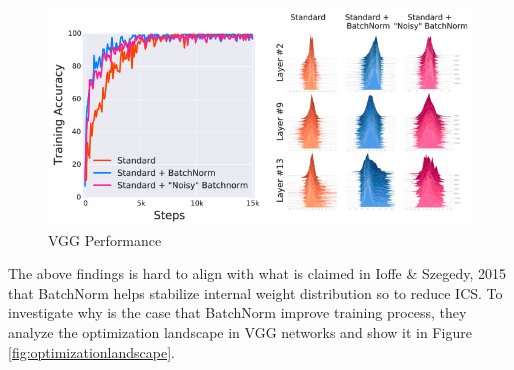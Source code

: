 \documentclass{article}
\begin{document}
\begin{figure}[h] 
	\centering
    \includegraphics[scale=0.6]{pics/batchNorm/Santurkar_fig2.jpg}
	\caption{VGG Performance}
	\label{fig:vgg}
\end{figure}

The above findings is hard to align with what is claimed in Ioffe \& Szegedy, 2015  \cite{batchnorm} that BatchNorm helps stabilize internal weight distribution so to reduce ICS. To investigate why is the case that BatchNorm improve training process, they analyze the optimization landscape in VGG networks and show it in Figure \ref{fig:optimizationlandscape}.
\end{document}
